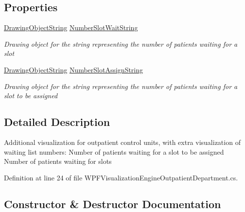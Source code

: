\subsection*{Properties}
\begin{DoxyCompactItemize}
\item 
\hyperlink{class_w_p_f_visualization_base_1_1_drawing_object_string}{Drawing\+Object\+String} \hyperlink{class_sample_hospital_model_1_1_visualization_1_1_w_p_f_visualization_engine_outpatient_department_a992d490ed94e38c9a9cf1b1f2ddff207}{Number\+Slot\+Wait\+String}
\begin{DoxyCompactList}\small\item\em Drawing object for the string representing the number of patients waiting for a slot \end{DoxyCompactList}\item 
\hyperlink{class_w_p_f_visualization_base_1_1_drawing_object_string}{Drawing\+Object\+String} \hyperlink{class_sample_hospital_model_1_1_visualization_1_1_w_p_f_visualization_engine_outpatient_department_af57ab2efb02c541b204a377740f69906}{Number\+Slot\+Assign\+String}
\begin{DoxyCompactList}\small\item\em Drawing object for the string representing the number of patients waiting for a slot to be assigned \end{DoxyCompactList}\end{DoxyCompactItemize}


\subsection{Detailed Description}
Additional visualization for outpatient control units, with extra visualization of waiting list numbers\+: Number of patients waiting for a slot to be assigned Number of patients waiting for slots 



Definition at line 24 of file W\+P\+F\+Visualization\+Engine\+Outpatient\+Department.\+cs.



\subsection{Constructor \& Destructor Documentation}
